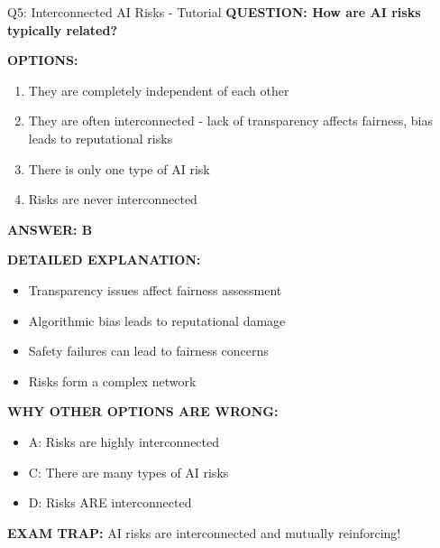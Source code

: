 \documentclass[8pt]{beamer}
\begin{document}
	\begin{frame}{Q5: Interconnected AI Risks - Tutorial}
		\fontsize{6.5}{7.5}\selectfont
		\textbf{QUESTION: How are AI risks typically related?}
		
		\vspace{0.1cm}
		\textbf{OPTIONS:}
		\begin{enumerate}
			\item They are completely independent of each other
			\item They are often interconnected - lack of transparency affects fairness, bias leads to reputational risks
			\item There is only one type of AI risk
			\item Risks are never interconnected
		\end{enumerate}
		
		\vspace{0.1cm}
		\textcolor{myblue}{\textbf{ANSWER: B}}
		
		\vspace{0.1cm}
		\textbf{DETAILED EXPLANATION:}
		\begin{itemize}
			\item Transparency issues affect fairness assessment
			\item Algorithmic bias leads to reputational damage
			\item Safety failures can lead to fairness concerns
			\item Risks form a complex network
		\end{itemize}
		
		\vspace{0.1cm}
		\textcolor{myred}{\textbf{WHY OTHER OPTIONS ARE WRONG:}}
		\begin{itemize}
			\item \textcolor{myred}{A:} Risks are highly interconnected
			\item \textcolor{myred}{C:} There are many types of AI risks
			\item \textcolor{myred}{D:} Risks ARE interconnected
		\end{itemize}
		
		\textcolor{myred}{\textbf{EXAM TRAP:}} AI risks are \textcolor{myblue}{interconnected and mutually reinforcing}!
	\end{frame}
	
	
\end{document}
